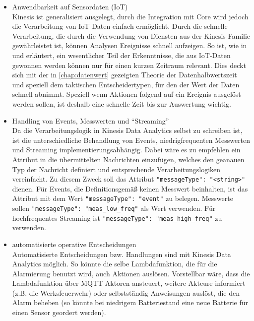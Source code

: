 \begin{itemize}
\item Anwendbarkeit auf Sensordaten (\ac{IoT})\\
Kinesis ist generalisiert ausgelegt, durch die Integration mit \AWSIOT{} Core wird jedoch die Verarbeitung von \ac{IoT} Daten einfach ermöglicht. Durch die schnelle Verarbeitung, die durch die Verwendung von Diensten aus der Kinesis Familie gewährleistet ist, können Analysen Ereignisse schnell aufzeigen. So ist, wie in  und  erläutert, ein wesentlicher Teil der Erkenntnisse, die aus \ac{IoT}-Daten gewonnen werden können nur für einen kurzen Zeitraum relevant. Dies deckt sich mit der in \autoref{chap:datenwert} gezeigten Theorie der Datenhalbwertszeit und speziell dem taktischen Entscheidertypen, für den der Wert der Daten schnell abnimmt. Speziell wenn Aktionen folgend auf ein Ereignis ausgelöst werden sollen, ist deshalb eine schnelle Zeit bis zur Auswertung wichtig.

\item Handling von Events, Messwerten und \enquote{Streaming}\\
Da die Verarbeitungslogik in Kinesis Data Analytics selbst zu schreiben ist, ist die unterschiedliche Behandlung von Events, niedrigfrequenten Messwerten und Streaming implementierungsabhängig. Dabei wäre es zu empfehlen ein Attribut in die übermittelten Nachrichten einzufügen, welches den geanauen Typ der Nachricht definiert und entsprechende Verarbeitungslogiken vereinfacht. Zu diesem Zweck soll das Attribut \texttt{{"messageType": "<string>"}} dienen. Für Events, die Definitionsgemäß keinen Messwert beinhalten, ist das Attribut mit dem Wert \texttt{{"messageType": "event"}} zu belegen. Messwerte sollen \texttt{{"messageType": "meas_low_freq"}} als Wert verwenden. Für hochfrequentes Streaming ist \texttt{{"messageType": "meas_high_freq"}} zu verwenden.

\item automatisierte operative Entscheidungen\\
Automatisierte Entscheidungen bzw. Handlungen sind mit Kinesis Data Analytics möglich. So könnte die selbe Lambdafunktion, die für die Alarmierung benutzt wird, auch Aktionen auslösen. Vorstellbar wäre, dass die Lambdafunktion über \ac{MQTT} Aktoren ansteuert, weitere Akteure informiert (z.B. die Werksfeuerwehr) oder selbstständig Anweisungen auslöst, die den Alarm beheben (so könnte bei niedrigem Batteriestand eine neue Batterie für einen Sensor geordert werden). 

\end{itemize}


